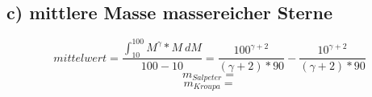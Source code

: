 \subsection{c) mittlere Masse massereicher Sterne}
\begin{equation}
mittelwert = \frac{ \int_{10}^{100} M^\gamma * M ~ dM }{100-10}=\frac {100^{\gamma + 2}}{(\gamma + 2) * 90} - \frac {10^{\gamma + 2}}{(\gamma + 2) * 90}
\end{equation}
\begin{equation}
m_{Salpeter} = 
\end{equation}
\begin{equation}
m_{Kroupa} =
\end{equation}
